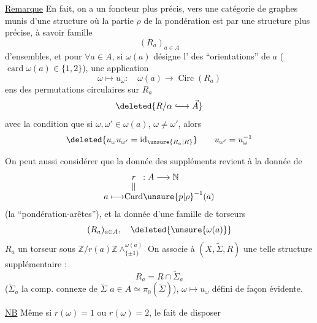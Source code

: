 \uline{Remarque} En fait, on a un foncteur plus précis, vers une catégorie de graphes munis d'une structure où la partie $\rho$ de la pondération est   par une structure plus précise, à savoir   famille
\[
 (R_a)_{a\in A}
\]
d'ensembles, et pour $\forall a\in A$, si $\omega(a)$ désigne l' des
``orientations'' de $a$ ($\operatorname{card}\omega(a)\in\{1,2\}$), une application
\[
 \omega\longmapsto u_\omega:\quad \omega(a)\longrightarrow\operatorname{Circ}(R_a)
\]
ens des permutations circulaires sur $R_a$
\[
 \deleted{R/\alpha\lhook\joinrel\longrightarrow\vec A}
\]
avec la condition que si $\omega,\omega'\in\omega(a)$, $\omega\ne\omega'$, alors
\[
 \deleted{u_\omega u_{\omega'}=\operatorname{id}_{\unsure{R_a|R}}}
 \qquad u_{\omega'}=u_\omega^{-1}
\]

On peut aussi considérer que la donnée des suppléments revient à la donnée de
\[
 \begin{array}{r@{}c@{}l}
 &r&:A\longrightarrow\mathbb N\\[-.3ex]
 &\Vert&\\[-.3ex]
 a\longmapsto&\operatorname{Card}&\unsure{p|\rho}^{-1}(a)
 \end{array}
\]
(la ``pondération-arêtes''), et la donnée d'une famille de torseurs
\[
 (R_a)_{a\in A},\quad \deleted{\unsure{\omega(a)}}
\]
$R_a$ un torseur sous $\mathbb Z/r(a)\mathbb Z\mathbin{\wedge}^{\omega(a)}_{\{\pm1\}}$
On associe à $(X,\widetilde\Sigma,R)$ une telle structure supplémentaire :
\[
 R_a=R\cap\widetilde\Sigma_a
\]
($\widetilde\Sigma_a$ la comp. connexe de $\widetilde\Sigma$   $a\in A\simeq\pi_0(\widetilde\Sigma)$),
$\omega\longmapsto u_\omega$ défini de façon évidente.

\uline{NB} Même si $r(\omega)=1$ ou $r(\omega)=2$, le fait de disposer
